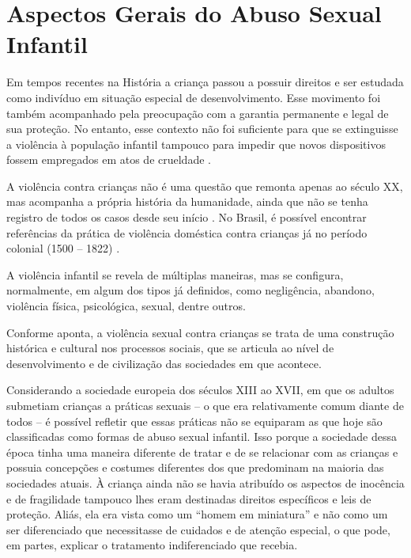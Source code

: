 
\chapter{Aspectos Gerais do Abuso Sexual Infantil}

Em tempos recentes na História a criança passou a possuir direitos e ser estudada como indivíduo em situação especial de desenvolvimento. Esse movimento foi também acompanhado pela preocupação com a garantia permanente e legal de sua proteção. No entanto, esse contexto não foi suficiente para que se extinguisse a violência à população infantil tampouco para impedir que novos dispositivos fossem empregados em atos de crueldade \cite{CAMPOS2002}. 

A violência contra crianças não é uma questão que remonta apenas ao século XX, mas acompanha a própria história da humanidade, ainda que não se tenha registro de todos os casos desde seu início . No Brasil, é possível encontrar referências da prática de violência doméstica contra crianças já no período colonial (1500 -- 1822) \cite{LONGO2002}.

A violência infantil se revela de múltiplas maneiras, mas se configura, normalmente, em algum dos tipos já definidos, como negligência, abandono, violência física, psicológica,  sexual, dentre outros. 

Conforme  aponta, a violência sexual contra crianças se trata de uma  construção histórica e cultural nos processos sociais, que se articula ao nível de desenvolvimento e de civilização das sociedades em que acontece. 

Considerando a sociedade europeia dos séculos XIII ao XVII, em que os adultos submetiam crianças a práticas sexuais -- o que era relativamente comum diante de todos -- é possível refletir que essas práticas não se equiparam as que hoje são classificadas como formas de abuso sexual infantil. Isso porque a sociedade dessa época tinha uma maneira diferente de tratar e de se relacionar com as crianças e possuia concepções e costumes diferentes dos que predominam na maioria das sociedades atuais. À criança ainda não se havia atribuído os aspectos de inocência e de fragilidade tampouco lhes eram destinadas direitos específicos e leis de proteção. Aliás, ela era vista como um ``homem em miniatura'' \cite{ARIES2011} e não como um ser diferenciado que necessitasse de cuidados e de atenção especial, o que pode, em partes, explicar o tratamento indiferenciado que recebia. 

